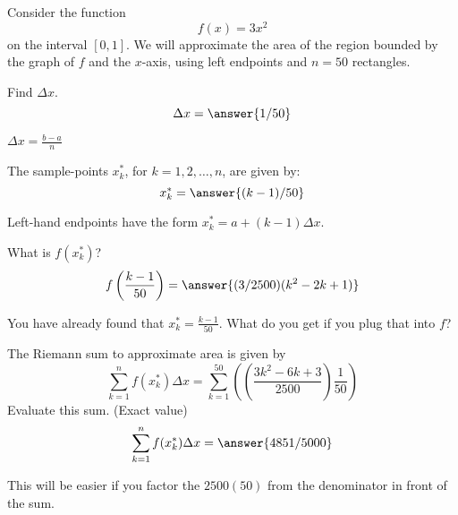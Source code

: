 \documentclass{ximera}
\author{Bobby Ramsey}
\begin{document}
Consider the function
\[
f(x) = 3x^2
\]
on the interval $[0,1]$.  We will approximate the area of the region bounded by the graph of $f$ and the $x$-axis, using
left endpoints and $n=50$ rectangles.

\begin{exercise}
	Find $\Delta x$.
	\[ \Delta x = \answer{1/50} \]
	\begin{hint}
		$\Delta x = \frac{b-a}{n}$
	\end{hint}
	\begin{exercise}
		The sample-points $x_k^*$, for $k = 1, 2, \ldots, n$, are given by:
		\[ x_k^* = \answer{(k-1)/50} \]
		\begin{hint}
			Left-hand endpoints have the form $x_k^* = a + (k-1) \Delta x$.
		\end{hint}	
		\begin{exercise}
			What is $f( x_k^* )$?
			\[ f\left( \frac{k-1}{50} \right) = \answer{(3/2500)(k^2-2k+1)} \]
			\begin{hint}
				You have already found that $x_k^* = \frac{k-1}{50}$.  What do you get if you plug that into $f$?
			\end{hint}
			\begin{exercise}
				The Riemann sum to approximate area is given by
				\[ \sum_{k=1}^{n} f(x_k^*) \Delta x = \sum_{k=1}^{50} \left( \left( \frac{3k^2-6k+3}{2500}\right) \frac{1}{50} \right)\]				
				Evaluate this sum. (Exact value)
				\[ \sum_{k=1}^{n} f(x_k^*) \Delta x = \answer{4851/5000} \]
				\begin{hint}
					This will be easier if you factor the $2500(50)$ from the denominator in front of the sum.
				\end{hint}
			\end{exercise}
		\end{exercise}
	\end{exercise}

\end{exercise}
\end{document}
